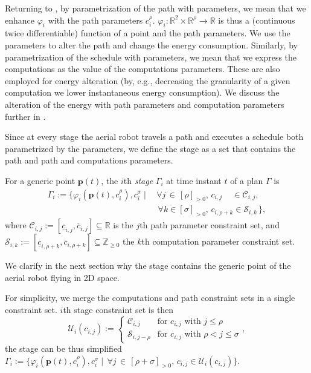 Returning to , by parametrization of the path with parameters, we mean that we enhance $\varphi_i$ with the path parameters $c_i^\rho$. $\varphi_i:\mathbb{R}^2\times\mathbb{R}^\rho\rightarrow\mathbb{R}$ is thus a (continuous twice differentiable) function of a point and the path parameters. We use the parameters to alter the path and change the energy consumption. Similarly, by parametrization of the schedule with parameters, we mean that we express the computations as the value of the computations parameters. These are also employed for energy alteration (by, e.g., decreasing the granularity of a given computation we lower instantaneous energy consumption). We discuss the alteration of the energy with path parameters and computation parameters further in .

Since at every stage the aerial robot travels a path and executes a schedule both parametrized by the parameters, we define the stage as a set that contains the path and path and computations parameters.

\begin{defn}[Stage]
  \label{def:stage}
  For a generic point $\mathbf{p}(t)$, the $i$th \emph{stage} $\Gamma_i$ at time instant $t$ of a plan $\Gamma$ is
  \begin{equation*}\begin{split}
    \Gamma_i:=\{\varphi_i(\mathbf{p}(t),c_i^\rho),c_i^\sigma\mid
    \,&\forall j\,\in\,[\rho]_{>0},\,c_{i,j}\,\,\,\,\,\,\,\in\mathcal{C}_{i,j},\,\\
      &\,\forall k\in[\sigma]_{>0},\,c_{i,\rho+k}\in\mathcal{S}_{i,k}\,\},
  \end{split}\end{equation*}
  where $\mathcal{C}_{i,j}:=[\underline{c}_{i,j},\overline{c}_{i,j}]\subseteq\mathbb{R}$ is the $j$th path parameter constraint set, and $\mathcal{S}_{i,k}:=[\underline{c}_{i,\rho+k},\overline{c}_{i,\rho+k}]\subseteq\mathbb{Z}_{\geq 0}$ the $k$th computation parameter constraint set.
\end{defn}

We clarify in the next section why the stage contains the generic point of the aerial robot flying in 2D space.

For simplicity, we merge the computations and path constraint sets in a single constraint set. $i$th stage constraint set is then
\begin{equation}\label{eq:constraint-set}
  \mathcal{U}_i(c_{i,j}):=\begin{cases}
  \mathcal{C}_{i,j} & \text{for } c_{i,j} \text{ with } j\leq\rho\\
  \mathcal{S}_{i,j-\rho} & \text{for } c_{i,j} \text{ with } \rho<j\leq\sigma
\end{cases},\end{equation}
the stage can be thus simplified $\Gamma_i:=\{\varphi_i(\mathbf{p}(t),c_i^\rho),c_i^\sigma\mid \,\forall j\,\in\,[\rho+\sigma]_{>0},\,c_{i,j}\in\mathcal{U}_i(c_{i,j})\}$.


